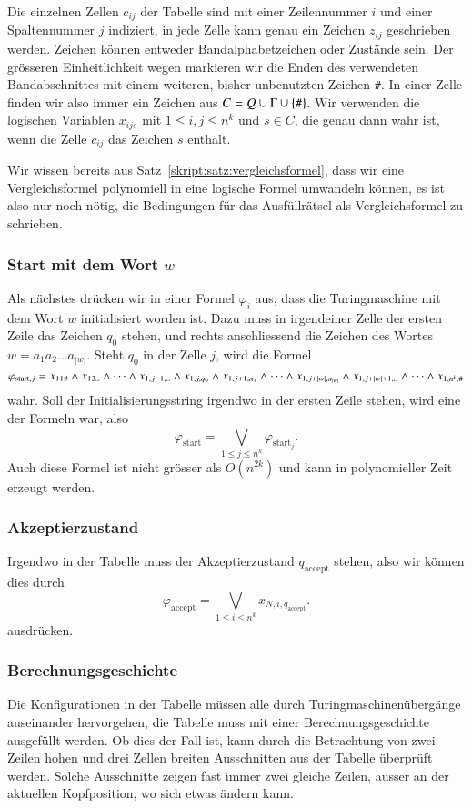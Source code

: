 Die einzelnen Zellen $c_{ij}$ der Tabelle sind mit einer Zeilennummer $i$
und einer Spaltennummer $j$ indiziert, in jede Zelle kann
genau ein Zeichen $z_{ij}$ geschrieben werden.
Zeichen können entweder Bandalphabetzeichen oder Zustände sein.
Der grösseren Einheitlichkeit wegen markieren wir die Enden des verwendeten
Bandabschnittes mit einem weiteren, bisher unbenutzten Zeichen {\tt\#}.
In einer Zelle finden wir also immer ein Zeichen aus $C=Q\cup \Gamma\cup\{\text{\tt\#}\}$.
Wir verwenden die logischen
Variablen $x_{ijs}$ mit $1\le i,j\le n^k$ und $s\in C$, die
genau dann wahr ist, wenn die Zelle $c_{ij}$ das Zeichen $s$ enthält.

Wir wissen bereits aus Satz~\ref{skript:satz:vergleichsformel}, dass wir
eine Vergleichsformel polynomiell in eine logische Formel umwandeln
können, es ist also nur noch nötig, die Bedingungen für das Ausfüllrätsel
als Vergleichsformel zu schrieben.


\subsubsection{Start mit dem Wort $w$}
Als nächstes drücken wir in einer Formel $\varphi_i$ aus,
dass die Turingmaschine mit dem Wort $w$ initialisiert worden ist.
Dazu muss in irgendeiner
Zelle der ersten Zeile das Zeichen $q_0$ stehen, und rechts
anschliessend die Zeichen des Wortes $w=a_1a_2\dots a_{|w|}$.
Steht $q_0$ in der
Zelle $j$, wird die Formel
\[
\varphi_{\text{start},j}
=
x_{11\#}\wedge
x_{12\blank}\wedge \dots \wedge
x_{1,j-1,\blank}\wedge
x_{1,j,q_0}\wedge
x_{1,j+1,a_1}\wedge\dots\wedge
x_{1,j+|w|,a_{|w|}}\wedge
x_{1,j+|w|+1,\blank}\wedge\dots\wedge
x_{1,n^k,\#}
\]
wahr.
Soll der Initialisierungsstring irgendwo in der ersten Zeile
stehen, wird eine der Formeln war, also
\[
\varphi_{\text{start}} = \bigvee_{1\le j\le n^k} \varphi_{\text{start}_j}.
\]
Auch diese Formel ist nicht grösser als $O(n^{2k})$ und kann in
polynomieller Zeit erzeugt werden.

\subsubsection{Akzeptierzustand}
Irgendwo in der Tabelle muss der Akzeptierzustand $q_\text{accept}$
stehen, also wir können dies durch 
\[
\varphi_{\text{accept}} 
=
\bigvee_{1\le i\le n^k} x_{N,i,q_{\text{accept}}}.
\]
ausdrücken.

\subsubsection{Berechnungsgeschichte}
Die Konfigurationen in der Tabelle müssen alle durch
Turingmaschinenübergänge auseinander hervorgehen, die Tabelle muss
mit einer Berechnungsgeschichte ausgefüllt werden.
Ob dies der Fall ist, kann durch die Betrachtung von zwei Zeilen
hohen und drei Zellen breiten Ausschnitten aus der Tabelle
überprüft werden.
Solche Ausschnitte zeigen fast immer zwei
gleiche Zeilen, ausser an der aktuellen Kopfposition, wo
sich etwas ändern kann.

